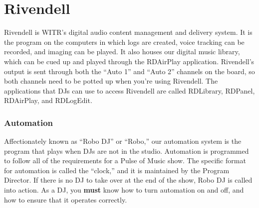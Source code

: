 \documentclass{witrman}
\begin{document}
\chapter{Rivendell}

Rivendell is WITR's digital audio content management and delivery system.  It is
the program on the computers in which logs are created, voice tracking can be
recorded, and imaging can be played.  It also houses our digital music library,
which can be cued up and played through the RDAirPlay application.  Rivendell's
output is sent through both the ``Auto 1'' and ``Auto 2'' channels on the board,
so both channels need to be potted up when you're using Rivendell.  The
applications that DJs can use to access Rivendell are called RDLibrary, RDPanel,
RDAirPlay, and RDLogEdit.

\subsection{Automation}

Affectionately known as ``Robo DJ'' or ``Robo,'' our automation system is the
program that plays when DJs are not in the studio.  Automation is programmed to
follow all of the requirements for a Pulse of Music show.  The specific format
for automation is called the ``clock,'' and it is maintained by the Program
Director.  If there is no DJ to take over at the end of the show, Robo DJ is
called into action.  As a DJ, you \textbf{must} know how to turn automation on
and off, and how to ensure that it operates correctly.
\end{document}
